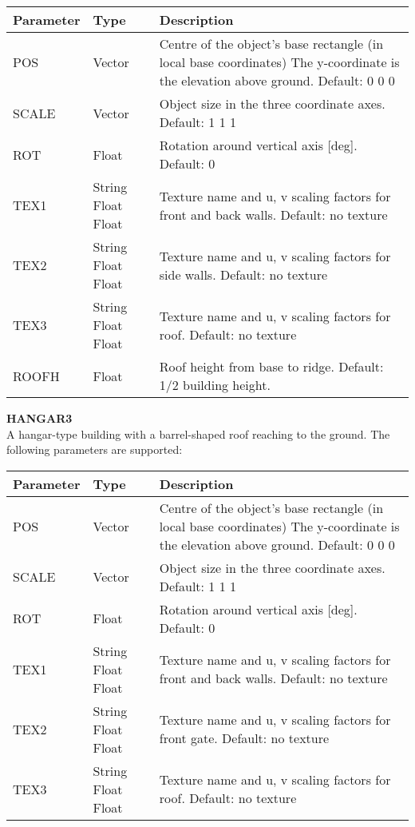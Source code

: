 \documentclass[Orbiter Developer Manual.tex]{subfiles}
\begin{document}
	\begin{longtable}{ |p{}|p{}|p{}| }
	\hline\rule{0pt}{2ex}
	\textbf{Parameter} & \textbf{Type} & \textbf{Description}\\
	\hline\rule{0pt}{2ex}
	POS & Vector & Centre of the object's base rectangle (in local base coordinates) The y-coordinate is the elevation above ground. Default: 0 0 0\\
	\hline\rule{0pt}{2ex}
	SCALE & Vector & Object size in the three coordinate axes. Default: 1 1 1\\
	\hline\rule{0pt}{2ex}
	ROT & Float & Rotation around vertical axis [deg]. Default: 0\\
	\hline\rule{0pt}{2ex}
	TEX1 & String Float Float & Texture name and u, v scaling factors for front and back walls. Default: no texture\\
	\hline\rule{0pt}{2ex}
	TEX2 & String Float Float & Texture name and u, v scaling factors for side walls. Default: no texture\\
	\hline\rule{0pt}{2ex}
	TEX3 & String Float Float & Texture name and u, v scaling factors for roof. Default: no texture\\
	\hline\rule{0pt}{2ex}
	ROOFH & Float & Roof height from base to ridge. Default: 1/2 building height.\\
	\hline
	\end{longtable}

\noindent
\textbf{HANGAR3}\\
A hangar-type building with a barrel-shaped roof reaching to the ground. The following parameters are supported:

	\begin{longtable}{ |p{}|p{}|p{}| }
	\hline\rule{0pt}{2ex}
	\textbf{Parameter} & \textbf{Type} & \textbf{Description}\\
	\hline\rule{0pt}{2ex}
	POS & Vector & Centre of the object's base rectangle (in local base coordinates) The y-coordinate is the elevation above ground. Default: 0 0 0\\
	\hline\rule{0pt}{2ex}
	SCALE & Vector & Object size in the three coordinate axes. Default: 1 1 1\\
	\hline\rule{0pt}{2ex}
	ROT & Float & Rotation around vertical axis [deg]. Default: 0\\
	\hline\rule{0pt}{2ex}
	TEX1 & String Float Float & Texture name and u, v scaling factors for front and back walls. Default: no texture\\
	\hline\rule{0pt}{2ex}
	TEX2 & String Float Float & Texture name and u, v scaling factors for front gate. Default: no texture\\
	\hline\rule{0pt}{2ex}
	TEX3 & String Float Float & Texture name and u, v scaling factors for roof. Default: no texture\\
	\hline
	\end{longtable}
\end{document}
